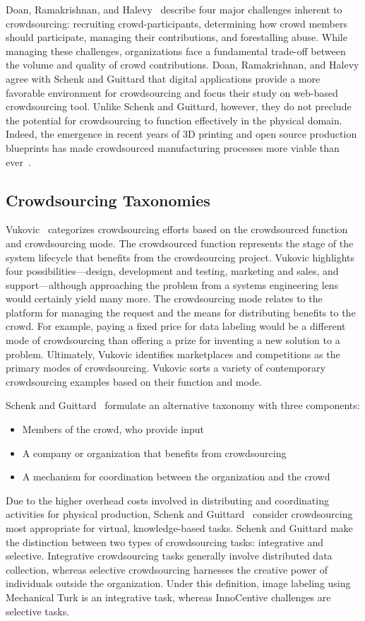 Doan, Ramakrishnan, and Halevy~\cite{doan} describe four major challenges inherent to crowdsourcing: recruiting crowd-participants, determining how crowd members should participate, managing their contributions, and forestalling abuse. While managing these challenges, organizations face a fundamental trade-off between the volume and quality of crowd contributions. Doan, Ramakrishnan, and Halevy agree with Schenk and Guittard that digital applications provide a more favorable environment for crowdsourcing and focus their study on web-based crowdsourcing tool. Unlike Schenk and Guittard, however, they do not preclude the potential for crowdsourcing to function effectively in the physical domain. Indeed, the emergence in recent years of 3D printing and open source production blueprints has made crowdsourced manufacturing processes more viable than ever~\cite{kostakis}.

\subsection{Crowdsourcing Taxonomies}

Vukovic~\cite{vukovic} categorizes crowdsourcing efforts based on the crowdsourced function and crowdsourcing mode. The crowdsourced function represents the stage of the system lifecycle that benefits from the crowdsourcing project. Vukovic highlights four possibilities---design, development and testing, marketing and sales, and support---although approaching the problem from a systems engineering lens would certainly yield many more. The crowdsourcing mode relates to the platform for managing the request and the means for distributing benefits to the crowd. For example, paying a fixed price for data labeling would be a different mode of crowdsourcing than offering a prize for inventing a new solution to a problem. Ultimately, Vukovic identifies marketplaces and competitions as the primary modes of crowdsourcing. Vukovic sorts a variety of contemporary crowdsourcing examples based on their function and mode.

Schenk and Guittard~\cite{schenk2} formulate an alternative taxonomy with three components:
\begin{itemize}
    \item Members of the crowd, who provide input
    \item A company or organization that benefits from crowdsourcing
    \item A mechanism for coordination between the organization and the crowd
\end{itemize}
Due to the higher overhead costs involved in distributing and coordinating activities for physical production, Schenk and Guittard~\cite{schenk2} consider crowdsourcing most appropriate for virtual, knowledge-based tasks. Schenk and Guittard make the distinction between two types of crowdsourcing tasks: integrative and selective. Integrative crowdsourcing tasks generally involve distributed data collection, whereas selective crowdsourcing harnesses the creative power of individuals outside the organization. Under this definition, image labeling using Mechanical Turk is an integrative task, whereas InnoCentive challenges are selective tasks.

